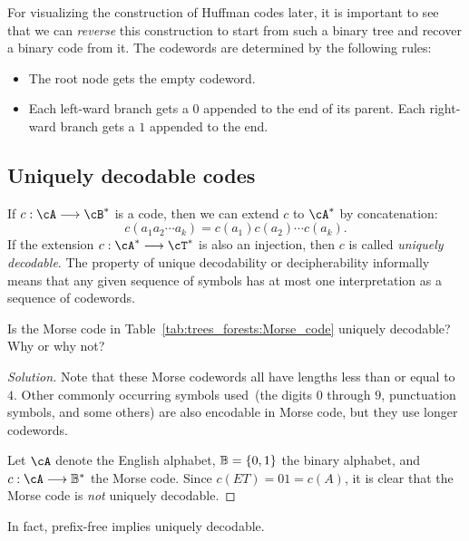 For visualizing the construction of Huffman codes
later, it is important to see that we can \emph{reverse} this
construction to start from such a binary tree and
recover a binary code from it. The codewords are
determined by the following rules:
\begin{itemize}
\item The root node gets the empty codeword.

\item Each left-ward branch gets a $0$ appended to the end of its
  parent. Each right-ward branch gets a $1$ appended to the end.
\end{itemize}



\subsection{Uniquely decodable codes}

If $c: \cA \to \cB^*$ is a code, then we can extend $c$ to $\cA^*$ by
concatenation:
\[
c(a_1 a_2 \cdots a_k)
=
c(a_1) c(a_2) \cdots c(a_k).
\]
If the extension $c: \cA^* \to \cT^*$ is also an injection, then $c$
is called \emph{uniquely decodable}.
The property of unique decodability or decipherability informally
means that any given sequence of symbols has at most one
interpretation as a sequence of codewords.

\begin{example}
Is the Morse code in
Table~\ref{tab:trees_forests:Morse_code} uniquely decodable? Why or
why not?
\end{example}

\begin{proof}[Solution]
Note that these Morse codewords all have lengths less than or equal to
$4$. Other commonly occurring symbols used~(the digits $0$ through
$9$, punctuation symbols, and some others) are also encodable in Morse
code, but they use longer codewords.

Let $\cA$ denote the English alphabet, $\mathbb{B} = \{0, 1\}$ the
binary alphabet, and $c: \cA \to \B^*$ the
Morse code. Since $c(ET) = 01 = c(A)$, it is clear
that the Morse code is \emph{not} uniquely decodable.
\end{proof}

In fact, prefix-free implies uniquely decodable.

